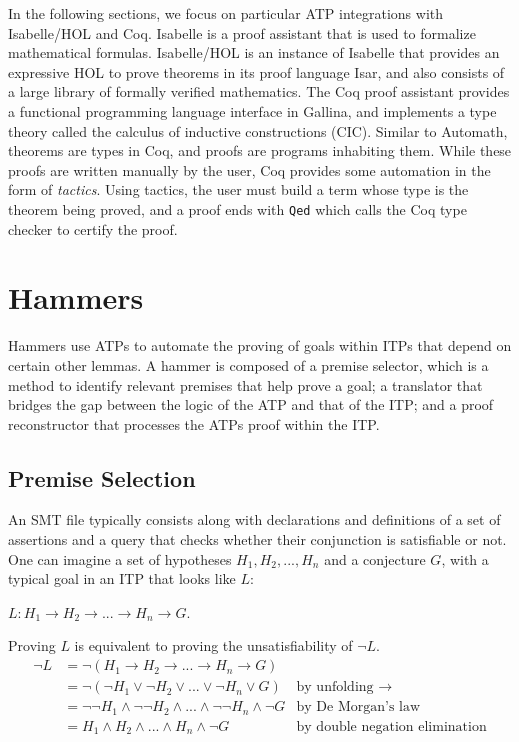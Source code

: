 \documentclass{article}
\begin{document}
	In the following sections, we focus on 
	particular ATP integrations with Isabelle/HOL 
	and Coq. Isabelle is a proof assistant that is 
	used to formalize mathematical formulas. 
	Isabelle/HOL is an instance of Isabelle that 
	provides an expressive HOL to prove theorems in 
	its proof language Isar, and also consists of a 
	large library of formally verified mathematics. 
	The Coq proof assistant provides a functional 
	programming language interface in Gallina, and 
	implements a type theory called the calculus of 
	inductive constructions (CIC). Similar to 
	Automath, theorems are types in Coq, and 
	proofs are programs inhabiting them. While these 
	proofs are written manually by the user, Coq 
	provides some automation in the form of 
	\textit{tactics}. Using tactics, the user 
	must build a term whose type is the theorem 
	being proved, and a proof ends with 
	\texttt{Qed} which calls the Coq type checker 
	to certify the proof.	
	
\section{Hammers}
\label{sec:hammer}
	Hammers use ATPs to automate the proving of goals within ITPs
	that depend on certain other lemmas. A hammer is composed of 
	a premise selector, which is a method to identify relevant 
	premises that help prove a goal; a translator that bridges 
	the gap between the logic of the ATP and that of the ITP; 
	and a proof reconstructor that processes the ATPs proof
	within the ITP.
	
	\subsection{Premise Selection}
		An SMT file	typically consists along with 
		declarations and definitions of a set of assertions 
		and a query that checks whether their conjunction is satisfiable or not. 
		One can imagine a set of hypotheses 
		$H_1, H_2, ..., H_n$ and a conjecture $G$, with a 
		typical goal in an ITP that looks like $L$:
		\begin{center}
			$L : H_1 \to H_2 \to ... \to H_n \to G$.
		\end{center}
		Proving $L$ is equivalent to proving the unsatisfiability 
		of $\neg L$.
		\begin{align*}
			\neg L &= \neg (H_1 \to H_2 \to ... \to H_n \to G)\\
			&= \neg (\neg H_1 \lor \neg H_2 \lor ... \lor \neg H_n \lor G)
			& \text{by unfolding }\to \\
			&= \neg \neg H_1 \land \neg \neg H_2 \land ... \land \neg \neg H_n 
			\land \neg G
			& \text{by De Morgan's law}\\
			&= H_1 \land H_2 \land ... \land H_n \land \neg G
			& \text{by double negation elimination}
		\end{align*}
	
\end{document}
